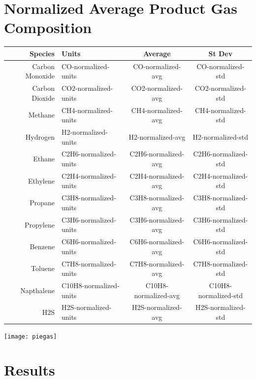 \documentclass[11pt]{article}
\begin{document}
\vspace{-4ex}
\section*{Normalized Average Product Gas Composition}
\vspace{-4ex}

\begin{table}[h]
\begin{minipage}[th]{0.5\linewidth}
\centering
\begin{tabular}{r l c c}
	Species		& Units				& Average				& St Dev				\\
\hline 	Carbon Monoxide	& CO-normalized-units		& CO-normalized-avg		& CO-normalized-std		\\
	Carbon Dioxide	& CO2-normalized-units		& CO2-normalized-avg		& CO2-normalized-std		\\
	Methane		& CH4-normalized-units		& CH4-normalized-avg		& CH4-normalized-std		\\
	Hydrogen		& H2-normalized-units		& H2-normalized-avg		& H2-normalized-std		\\
	Ethane		& C2H6-normalized-units		& C2H6-normalized-avg		& C2H6-normalized-std		\\
	Ethylene		& C2H4-normalized-units		& C2H4-normalized-avg		& C2H4-normalized-std		\\
	Propane		& C3H8-normalized-units		& C3H8-normalized-avg		& C3H8-normalized-std		\\
	Propylene		& C3H6-normalized-units		& C3H6-normalized-avg		& C3H6-normalized-std		\\
	Benzene		& C6H6-normalized-units		& C6H6-normalized-avg		& C6H6-normalized-std		\\
	Toluene		& C7H8-normalized-units		& C7H8-normalized-avg		& C7H8-normalized-std		\\
	Napthalene		& C10H8-normalized-units		& C10H8-normalized-avg		& C10H8-normalized-std		\\
	H2S 			& H2S-normalized-units		& H2S-normalized-avg		& H2S-normalized-std		\\
\end{tabular}
\end{minipage}
\begin{minipage}[bh]{0.5\linewidth}
\texttt{[image: piegas]}
\end{minipage}
\end{table}

\vspace{-6ex}
\section*{Results}
\vspace{-2ex}
\end{document}

